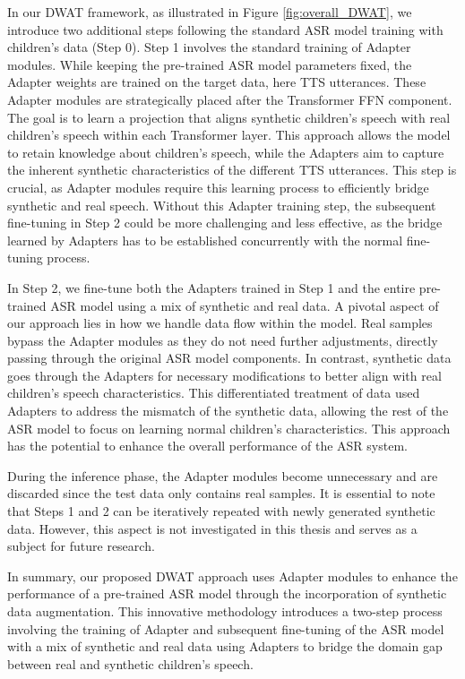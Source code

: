 In our \ac{DWAT}  framework, as illustrated in Figure \ref{fig:overall_DWAT}, we introduce two additional steps following the standard \ac{ASR} model training with children's data (Step 0).
Step 1 involves the standard training of Adapter modules. While keeping the pre-trained \ac{ASR} model parameters fixed, the Adapter weights are trained on the target data, here \ac{TTS} utterances. These Adapter modules are strategically placed after the Transformer \ac{FFN} component. The goal is to learn a projection that aligns synthetic children's speech with real children's speech within each Transformer layer. This approach allows the model to retain knowledge about children's speech, while the Adapters aim to capture the inherent synthetic characteristics of the different \ac{TTS} utterances. This step is crucial, as Adapter modules require this learning process to efficiently bridge synthetic and real speech. Without this Adapter training step, the subsequent fine-tuning in Step 2 could be more challenging and less effective, as the bridge learned by Adapters has to be established concurrently with the normal fine-tuning process.

In Step 2, we fine-tune both the Adapters trained in Step 1 and the entire pre-trained \ac{ASR} model using a mix of synthetic and real data. A pivotal aspect of our approach lies in how we handle data flow within the model. Real samples bypass the Adapter modules as they do not need further adjustments, directly passing through the original \ac{ASR} model components. In contrast, synthetic data goes through the Adapters for necessary modifications to better align with real children's speech characteristics. This differentiated treatment of data used Adapters to address the mismatch of the synthetic data, allowing the rest of the \ac{ASR} model to focus on learning normal children's characteristics. This approach has the potential to enhance the overall performance of the \ac{ASR} system.

During the inference phase, the Adapter modules become unnecessary and are discarded since the test data only contains real samples. It is essential to note that Steps 1 and 2 can be iteratively repeated with newly generated synthetic data. However, this aspect is not investigated in this thesis and serves as a subject for future research.

In summary, our proposed \ac{DWAT} approach uses Adapter modules to enhance the performance of a pre-trained \ac{ASR} model through the incorporation of synthetic data augmentation. This innovative methodology introduces a two-step process involving the training of Adapter and subsequent fine-tuning of the \ac{ASR} model with a mix of synthetic and real data using Adapters to bridge the domain gap between real and synthetic children's speech.



